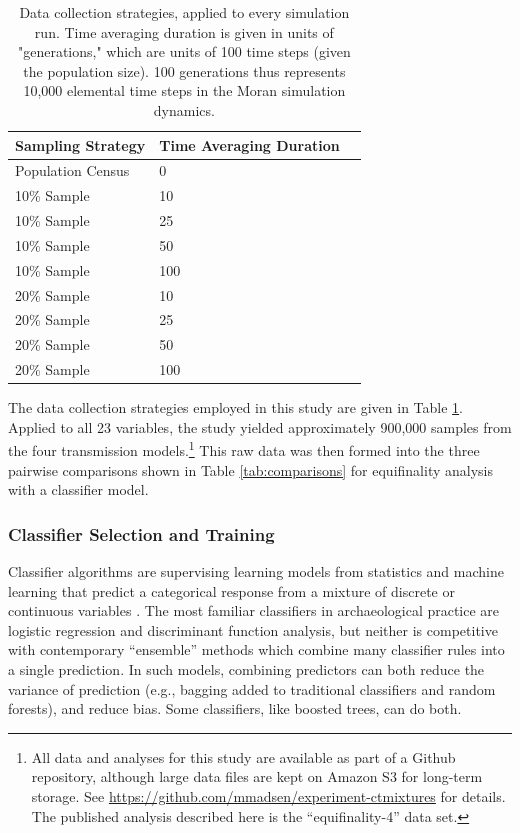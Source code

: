 \documentclass[10pt,letterpaper]{article}
\begin{document}
\begin{table}[ht]
    \begin{tabular}{lll}
        \hline
        Sampling Strategy & Time Averaging Duration \\ 
        \hline
        Population Census & 0 \\
        10\% Sample & 10 \\
        10\% Sample & 25  \\
        10\% Sample & 50 \\
        10\% Sample & 100 \\
        20\% Sample & 10  \\
        20\% Sample & 25 \\
        20\% Sample & 50 \\
        20\% Sample & 100 \\
        \hline
    \end{tabular}
    \caption{Data collection strategies, applied to every simulation run.  Time averaging duration is given in units of "generations," which are units of 100 time steps (given the population size).  100 generations thus represents 10,000 elemental time steps in the Moran simulation dynamics.}
    \label{tab:measurement-strategies}
\end{table}

The data collection strategies employed in this study are given in Table \ref{tab:measurement-strategies}.  Applied to all 23 variables, the study yielded approximately 900,000 samples from the four transmission models.\footnote{All data and analyses for this study are available as part of a Github repository, although large data files are kept on Amazon S3 for long-term storage.  See \url{https://github.com/mmadsen/experiment-ctmixtures} for details.  The published analysis described here is the ``equifinality-4'' data set.}  This raw data was then formed into the three pairwise comparisons shown in Table \ref{tab:comparisons} for equifinality analysis with a classifier model.

\subsubsection{Classifier Selection and
Training}\label{classifier-selection-and-training}

Classifier algorithms are supervising learning models from statistics
and machine learning that predict a categorical response from a mixture
of discrete or continuous variables \cite{hastie2009elements}. The most
familiar classifiers in archaeological practice are logistic regression
and discriminant function analysis, but neither is competitive with
contemporary ``ensemble'' methods which combine many classifier rules
into a single prediction. In such models, combining predictors can both
reduce the variance of prediction (e.g., bagging added to traditional
classifiers and random forests), and
reduce bias.  Some classifiers, like boosted trees, can do both.
\end{document}
